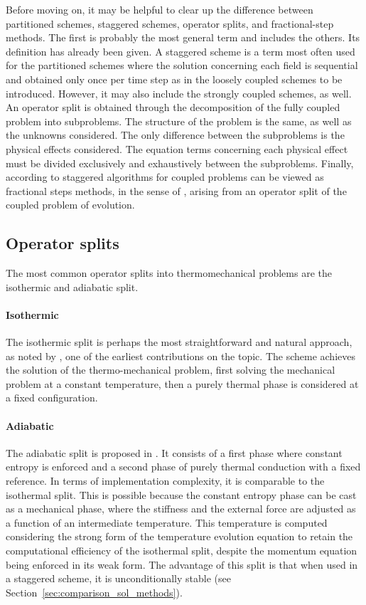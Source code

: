 Before moving on, it may be helpful to clear up the difference between partitioned schemes, staggered schemes, operator splits, and fractional-step methods.
The first is probably the most general term and includes the others.
Its definition has already been given.
A staggered scheme is a term most often used for the partitioned schemes where the solution concerning each field is sequential and obtained only once per time step as in the loosely coupled schemes to be introduced.
However, it may also include the strongly coupled schemes, as well.
An operator split is obtained through the decomposition of the fully coupled problem into subproblems.
The structure of the problem is the same, as well as the unknowns considered.
The only difference between the subproblems is the physical effects considered.
The equation terms concerning each physical effect must be divided exclusively and exhaustively between the subproblems.
Finally, according to \cite{armero_new_1992} staggered algorithms for coupled problems can be viewed as fractional steps methods, in the sense of \cite{holt_method_2012}, arising from an operator split of the coupled problem of evolution.

\subsection{Operator splits}

The most common operator splits into thermomechanical problems are the isothermic and adiabatic split.

\paragraph{Isothermic}

The isothermic split is perhaps the most straightforward and natural approach, as noted by \cite{argyris_natural_1981}, one of the earliest contributions on the topic.
The scheme achieves the solution of the thermo-mechanical problem, first solving the mechanical problem at a constant temperature, then a purely thermal phase is considered at a fixed configuration.

\paragraph{Adiabatic}

The adiabatic split is proposed in \cite{armero_new_1992}.
It consists of a first phase where constant entropy is enforced and a second phase of purely thermal conduction with a fixed reference.
In terms of implementation complexity, it is comparable to the isothermal split.
This is possible because the constant entropy phase can be cast as a mechanical phase, where the stiffness and the external force are adjusted as a function of an intermediate temperature.
This temperature is computed considering the strong form of the temperature evolution equation to retain the computational efficiency of the isothermal split, despite the momentum equation being enforced in its weak form.
The advantage of this split is that when used in a staggered scheme, it is unconditionally stable (see Section~\ref{sec:comparison_sol_methods}).


